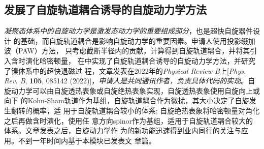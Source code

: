 


\subsection{发展了自旋轨道耦合诱导的自旋动力学方法}

\emph{凝聚态体系中的自旋动力学是激发态动力学的重要组成部分}，也是超快自旋器件设计
的基础，而自旋轨道耦合是影响自旋动力学的重要因素。申请人使用投影缀加波（PAW）方法，
只考虑截断半径内的贡献，计算得到自旋轨道耦合，并将其引入含时演化哈密顿量，
在\hnamd{}中实现了自旋轨道耦合诱导的自旋动力学方法，并研究了镍体系中的超快退磁过
程，文章发表在2022年的\textit{Physical Review B}上[\textit{Phys. Rev. B},
\textbf{105}, 085142 (2022)]，\emph{申请人是共同通讯作者，负责具体代码的实现}。自
旋动力学可以由自旋透热表象或自旋绝热表象实现，自旋透热表象使用自旋向上或向下
的Kohn-Sham轨道作为基组，自旋轨道耦合作为微扰，其大小决定了自旋发生翻转的概率，适
用于自旋轨道耦合较小的体系; 自旋绝热表象将哈密顿量对角化之后再做含时演化，使用任
意方向spinor作为基组，适用于自旋轨道耦合较大的体系。文章发表之后，自旋动力学作
为\hnamd{}的新功能迅速得到业内同行的关注与应用。不到一年时间内基于本模块已发表文
章篇。


